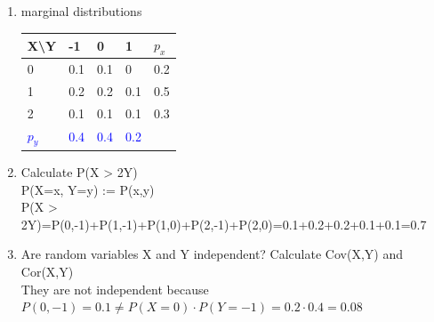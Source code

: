 \documentclass[a4paper]{article}
\begin{document}
\begin{enumerate}[label=\emph{\alph*})]
\item  marginal distributions
\begin{table}[H]
\begin{center}
  \begin{tabular}{ l | l l l | l}
    X\textbackslash Y & -1 & 0 & 1 & \textcolor{Emerald}{$p_x$} \\ \hline
    0 & 0.1 & 0.1 & 0 & \textcolor{Emerald}{0.2}\\
    1 & 0.2 & 0.2 & 0.1 & \textcolor{Emerald}{0.5}\\
    2 & 0.1 & 0.1 & 0.1 & \textcolor{Emerald}{0.3}\\
    \hline
    \textcolor{blue}{$p_y$} & \textcolor{blue}{0.4} & \textcolor{blue}{0.4} &
    \textcolor{blue}{0.2} & \\
  \end{tabular}
\end{center}
\end{table}
\item Calculate P(X > 2Y)
\\

P(X=x, Y=y) := P(x,y)
\\

P(X > 2Y)=P(0,-1)+P(1,-1)+P(1,0)+P(2,-1)+P(2,0)=0.1+0.2+0.2+0.1+0.1=0.7
\\

\item Are random variables X and Y independent? Calculate Cov(X,Y) and Cor(X,Y)
\\

They are not independent because $P(0,-1)=0.1 \neq P(X=0)\cdot P(Y=-1)=0.2\cdot 0.4 = 0.08$
\\


\end{enumerate}
\end{document}
